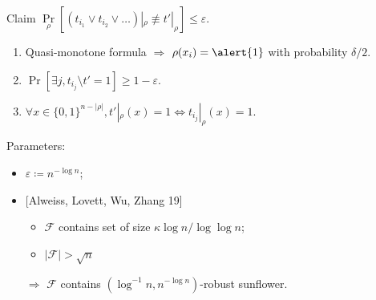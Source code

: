 \begin{frame}

    \begin{block}{Claim}
        $\Pr\limits_{\rho}[(t_{i_1} \lor t_{i_2} \lor \dots)|_{\rho} \not\equiv t'|_{\rho}] \le \varepsilon$. 
    \end{block}

    \begin{enumerate}
        \item \alert{Quasi}-monotone formula $\Rightarrow$ $\rho(x_i) = \alert{1}$ with probability
            $\delta / 2$.
        \pause
        \item $\Pr[\exists j, t_{i_j} \setminus t' = 1] \ge 1 - \varepsilon$.
            \pause
            \hspace{0.1cm}
            
            \pause
        \item $\forall x \in \{0, 1\}^{n - |\rho|},  t'|_{\rho}(x) = 1 \Leftrightarrow t_{i_j}|_{\rho}(x) = 1$.
    \end{enumerate}

    \vspace{1cm}
    \pause

    Parameters:
    \begin{itemize}
        \item $\varepsilon \coloneqq n^{- \log n}$;
        \item{} [Alweiss, Lovett, Wu, Zhang 19]
            \begin{itemize}
                \item $\mathcal{F}$ contains set of size $\kappa \log n / \log \log n$;
                \item $|\mathcal{F}| > \sqrt{n}$
            \end{itemize}
            $\Rightarrow$ $\mathcal{F}$ contains $(\log^{-1} n, n^{-\log n})$-robust sunflower.
    \end{itemize}
\end{frame}


